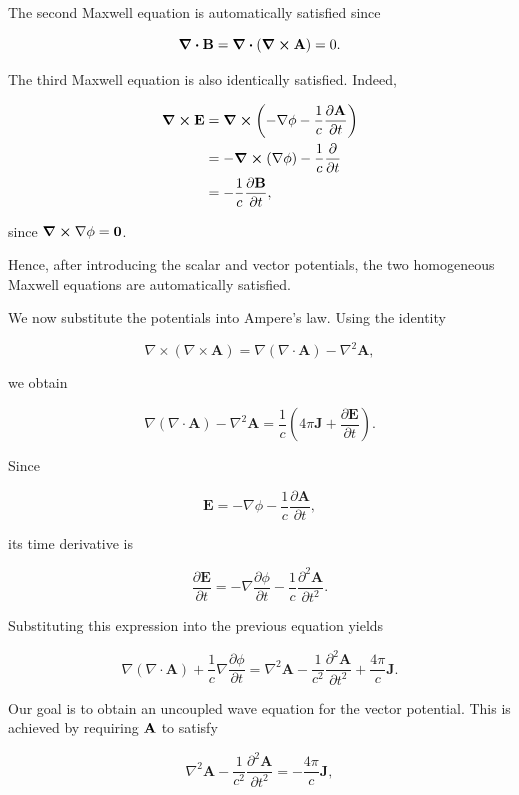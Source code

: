 \documentclass[12pt]{article}
\begin{document}
The second Maxwell equation is automatically satisfied since

\[
  \div \vb{B}
  =
  \div(\curl\vb{A})
  =
  0.
\]

The third Maxwell equation is also identically satisfied. Indeed,

\begin{align}
  \curl \vb{E}
    &=
    \curl\left(
      -\nabla\phi
      -\frac{1}{c}\pdv{\vb{A}}{t}
    \right) \\
    &=
    -\curl(\nabla\phi)
    -\frac{1}{c}\pdv{}{t}(\curl\vb{A}) \\
    &=
    -\frac{1}{c}\pdv{\vb{B}}{t},
\end{align}

since $\curl\nabla\phi=\vb 0$.

Hence, after introducing the scalar and vector potentials, the two homogeneous
Maxwell equations are automatically satisfied.

We now substitute the potentials into Ampere's law. Using the identity

\[
\nabla\times(\nabla\times\mathbf A)
=
\nabla(\nabla\cdot\mathbf A)
-
\nabla^2\mathbf A,
\]

we obtain

\[
\nabla(\nabla\cdot\mathbf A)
-
\nabla^2\mathbf A
=
\frac{1}{c}
\left(
4\pi\mathbf J
+
\frac{\partial\mathbf E}{\partial t}
\right).
\]

Since

\[
\mathbf E
=
-\nabla\phi
-
\frac{1}{c}
\frac{\partial\mathbf A}{\partial t},
\]

its time derivative is

\[
\frac{\partial\mathbf E}{\partial t}
=
-
\nabla\frac{\partial\phi}{\partial t}
-
\frac{1}{c}
\frac{\partial^2\mathbf A}{\partial t^2}.
\]

Substituting this expression into the previous equation yields

\[
\nabla(\nabla\cdot\mathbf A)
+
\frac{1}{c}
\nabla\frac{\partial\phi}{\partial t}
=
\nabla^2\mathbf A
-
\frac{1}{c^2}
\frac{\partial^2\mathbf A}{\partial t^2}
+
\frac{4\pi}{c}\mathbf J.
\]

Our goal is to obtain an uncoupled wave equation for the vector potential.
This is achieved by requiring $\vb A$ to satisfy

\begin{equation}
\nabla^2\mathbf A
-
\frac{1}{c^2}
\frac{\partial^2\mathbf A}{\partial t^2}
=
-
\frac{4\pi}{c}\mathbf J,
\label{eq:wave_vector_potential}
\end{equation}
\end{document}
